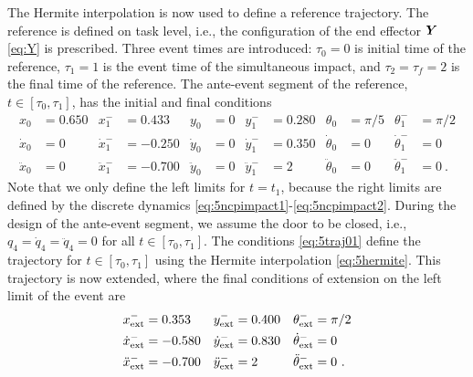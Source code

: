 \documentclass[../DC2019003Bouma.tex]{subfiles}
\begin{document}
The Hermite interpolation is now used to define a reference trajectory. The reference is defined on task level, i.e., the configuration of the end effector ${\boldsymbol{Y}}$ \eqref{eq:Y} is prescribed. Three event times are introduced: $\tau_0=0$ is initial time of the reference, $\tau_1=1$ is the event time of the simultaneous impact, and $\tau_2 = \tau_f=2$ is the final time of the reference. The ante-event segment of the reference, $t \in [\tau_0,\tau_1]$, has the initial and final conditions
\begin{align}
x_0&= 0.650 &x^-_1&= 0.433 &y_0&= 0 &y^-_1&= 0.280 &\theta_0&= \pi/5 &\theta^-_1&= \pi/2\nonumber\\
\dot{x}_0&= 0 &\dot{x}^-_1&= -0.250 &\dot{y}_0&= 0 &\dot{y}^-_1&= 0.350 &\dot{\theta}_0&= 0 &\dot{\theta}^-_1&= 0\label{eq:5traj01}\\
\ddot{x}_0&= 0 &\ddot{x}^-_1&= -0.700 &\ddot{y}_0&= 0 &\ddot{y}^-_1&= 2 &\ddot{\theta}_0&= 0 &\ddot{\theta}^-_1&= 0\ .\nonumber
\end{align}
Note that we only define the left limits for $t=t_1$, because the right limits are defined by the discrete dynamics \eqref{eq:5ncpimpact1}-\eqref{eq:5ncpimpact2}. During the design of the ante-event segment, we assume the door to be closed, i.e., $q_4=\dot{q}_4=\ddot{q}_4=0$ for all $t\in[\tau_0,\tau_1]$. The conditions \eqref{eq:5traj01} define the trajectory for $t\in[\tau_0,\tau_1]$ using the Hermite interpolation \eqref{eq:5hermite}. This trajectory is now extended, where the final conditions of extension on the left limit of the event are
\begin{align}
x^-_{\textnormal{ext}}&= 0.353 &y^-_{\textnormal{ext}}&= 0.400 &\theta^-_{\textnormal{ext}}&= \pi/2\nonumber\\
\dot{x}^-_{\textnormal{ext}}&= -0.580 &\dot{y}^-_{\textnormal{ext}}&= 0.830 &\dot{\theta}^-_{\textnormal{ext}}&= 0\\
\ddot{x}^-_{\textnormal{ext}}&= -0.700 &\ddot{y}^-_{\textnormal{ext}}&= 2 &\ddot{\theta}^-_{\textnormal{ext}}&= 0\ .\nonumber
\end{align}
\end{document}
